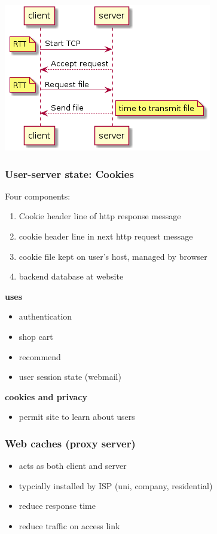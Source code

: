 \documentclass[11pt]{article}
\begin{document}
\begin{center}
\includegraphics[width=.9\linewidth]{http.png}
\end{center}

\subsubsection{User-server state: Cookies}
\label{sec:orgadcde0b}
Four components:
\begin{enumerate}
\item Cookie header line of http response message
\item cookie header line in next http request message
\item cookie file kept on user's host, managed by browser
\item backend database at website
\end{enumerate}

\textbf{uses}
\begin{itemize}
\item authentication
\item shop cart
\item recommend
\item user session state (webmail)
\end{itemize}

\textbf{cookies and privacy}
\begin{itemize}
\item permit site to learn about users
\end{itemize}

\subsubsection{Web caches (proxy server)}
\label{sec:orgca71c9f}
\begin{itemize}
\item acts as both client and server
\item typcially installed by ISP (uni, company, residential)
\item reduce response time
\item reduce traffic on access link
\end{itemize}
\end{document}
